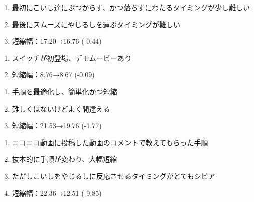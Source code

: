 \begin{enumerate}[label={\sarrow}]
\item 最初にこいし達にぶつからず、かつ落ちずにわたるタイミングが少し難しい
\item 最後にスムーズにやじるしを運ぶタイミングが難しい
\item 短縮幅：17.20→16.76 (-0.44)
\end{enumerate}








\begin{enumerate}[label={\sarrow}]
\item スイッチが初登場、デモムービーあり
\item 短縮幅：8.76→8.67 (-0.09)
\end{enumerate}



\begin{enumerate}[label={\sarrow}]
\item 手順を最適化し、簡単化かつ短縮
\item 難しくはないけどよく間違える
\item 短縮幅：21.53→19.76 (-1.77)
\end{enumerate}



\begin{enumerate}[label={\sarrow}]
\item ニコニコ動画に投稿した動画のコメントで教えてもらった手順
\item 抜本的に手順が変わり、大幅短縮
\item ただしこいしをやじるしに反応させるタイミングがとてもシビア
\item 短縮幅：22.36→12.51 (-9.85)
\end{enumerate}



